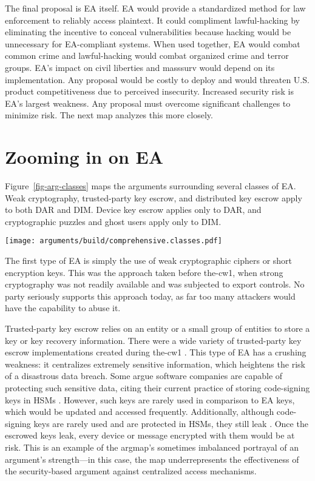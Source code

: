 \documentclass{IEEEtran}
\newcommand{\myfig}[1]{Figure~\ref{#1}}
\begin{document}
The final proposal is \ac{EA} itself. \ac{EA} would provide a standardized method for law enforcement to reliably access
\ac{plaintext}. It could compliment \ac{lawful-hacking} by eliminating the incentive to conceal vulnerabilities because
hacking would be unnecessary for \ac{EA}-compliant systems. When used together, \ac{EA} would combat common crime and
\ac{lawful-hacking} would combat organized crime and terror groups. \Ac{EA}'s impact on civil liberties and
\ac{masssurv} would depend on its implementation. Any proposal would be costly to deploy and would threaten U.S. product
competitiveness due to perceived insecurity. Increased security risk is \ac{EA}'s largest weakness. Any proposal must
overcome significant challenges to minimize risk. The next map analyzes this more closely.


\section{Zooming in on EA}
\label{sec-ea-types}

\myfig{fig-arg-classes} maps the arguments surrounding several classes of \ac{EA}. Weak cryptography, trusted-party key
escrow, and distributed key escrow apply to both \ac{DAR} and \ac{DIM}. Device key escrow applies only to \ac{DAR}, and
cryptographic puzzles and ghost users apply only to \ac{DIM}.

\begin{sidewaysfigure*}[p!]
  \centering
  \texttt{[image: arguments/build/comprehensive.classes.pdf]}
  \caption{Classes of EA}
  \label{fig-arg-classes}
\end{sidewaysfigure*}

The first type of \ac{EA} is simply the use of weak cryptographic ciphers or short encryption keys. This was the
approach taken before \ac{the-cw1}, when strong cryptography was not readily available and was subjected to export
controls. No party seriously supports this approach today, as far too many attackers would have the capability to abuse
it.

Trusted-party key escrow relies on an entity or a small group of entities to store a key or key recovery information.
There were a wide variety of trusted-party key escrow implementations created during \ac{the-cw1}
\cite{denning_taxonomy_1996}. This type of \ac{EA} has a crushing weakness: it centralizes extremely sensitive
information, which heightens the risk of a disastrous data breach. Some argue software companies are capable of
protecting such sensitive data, citing their current practice of storing code-signing keys in \acp{HSM}
\cite{ozzie_2018}. However, such keys are rarely used in comparison to \ac{EA} keys, which would be updated and accessed
frequently. Additionally, although code-signing keys are rarely used and are protected in \acp{HSM}, they still leak
\cite{green_2018}. Once the escrowed keys leak, every device or message encrypted with them would be at risk. This is an
example of the \ac{argmap}'s sometimes imbalanced portrayal of an argument's strength---in this case, the map
underrepresents the effectiveness of the security-based argument against centralized access mechanisms.
\end{document}
